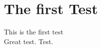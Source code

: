 \documentclass[]{article}
\title{}
\author{}
\begin{document}
\maketitle

\begin{abstract}

\end{abstract}

\section{The first Test}

This is the first test \\
Great test.
Test.
\end{document}
